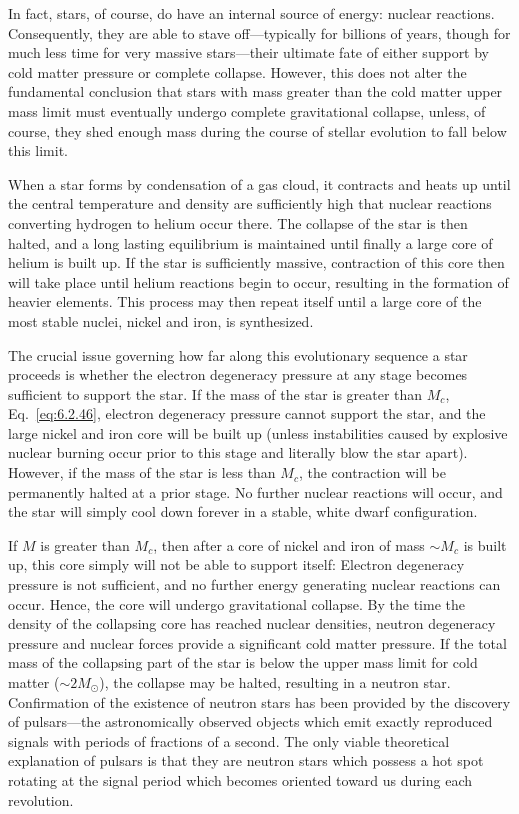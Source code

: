 In fact, stars, of course, do have an internal source of energy: nuclear
reactions. Consequently, they are able to stave off---typically for billions of
years, though for much less time for very massive stars---their ultimate fate of
either support by cold matter pressure or complete collapse. However, this does
not alter the fundamental conclusion that stars with mass greater than the cold
matter upper mass limit must eventually undergo complete gravitational collapse,
unless, of course, they shed enough mass during the course of stellar evolution to
fall below this limit.

When a star forms by condensation of a gas cloud, it contracts and heats up until
the central temperature and density are sufficiently high that nuclear reactions
converting hydrogen to helium occur there. The collapse of the star is then halted,
and a long lasting equilibrium is maintained until finally a large core of helium
is built up. If the star is sufficiently massive, contraction of this core then
will take place until helium reactions begin to occur, resulting in the formation
of heavier elements. This process may then repeat itself until a large core of the
most stable nuclei, nickel and iron, is synthesized.

The crucial issue governing how far along this evolutionary sequence a star
proceeds is whether the electron degeneracy pressure at any stage becomes
sufficient to support the star. If the mass of the star is greater than \(M_c\),
Eq.~\eqref{eq:6.2.46}, electron degeneracy pressure cannot support the star, and
the large nickel and iron core will be built up (unless instabilities caused by
explosive nuclear burning occur prior to this stage and literally blow the star
apart). However, if the mass of the star is less than \(M_c\), the contraction will
be permanently halted at a prior stage. No further nuclear reactions will occur,
and the star will simply cool down forever in a stable, white dwarf configuration.

If \(M\) is greater than \(M_c\), then after a core of nickel and iron of mass
\(\sim M_c\) is built up, this core simply will not be able to support itself:
Electron degeneracy pressure is not sufficient, and no further energy generating
nuclear reactions can occur. Hence, the core will undergo gravitational collapse.
By the time the density of the collapsing core has reached nuclear densities,
neutron degeneracy pressure and nuclear forces provide a significant cold matter
pressure. If the total mass of the collapsing part of the star is below the upper
mass limit for cold matter (\(\sim2M_\odot\)), the collapse may be halted,
resulting in a neutron star. Confirmation of the existence of neutron stars has
been provided by the discovery of pulsars---the astronomically observed objects
which emit exactly reproduced signals with periods of fractions of a second. The
only viable theoretical explanation of pulsars is that they are neutron stars
which possess a hot spot rotating at the signal period which becomes oriented
toward us during each revolution.

